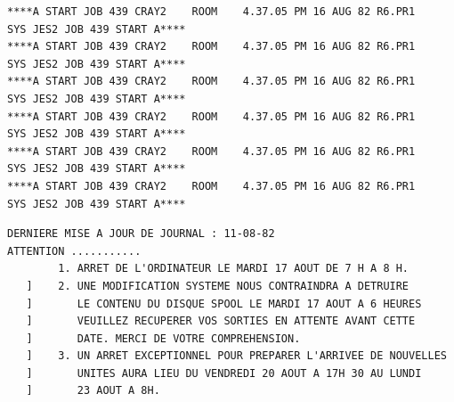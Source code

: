\begin{verbatim}
****A START JOB 439 CRAY2    ROOM    4.37.05 PM 16 AUG 82 R6.PR1    SYS JES2 JOB 439 START A****
****A START JOB 439 CRAY2    ROOM    4.37.05 PM 16 AUG 82 R6.PR1    SYS JES2 JOB 439 START A****
****A START JOB 439 CRAY2    ROOM    4.37.05 PM 16 AUG 82 R6.PR1    SYS JES2 JOB 439 START A****
****A START JOB 439 CRAY2    ROOM    4.37.05 PM 16 AUG 82 R6.PR1    SYS JES2 JOB 439 START A****
****A START JOB 439 CRAY2    ROOM    4.37.05 PM 16 AUG 82 R6.PR1    SYS JES2 JOB 439 START A****
****A START JOB 439 CRAY2    ROOM    4.37.05 PM 16 AUG 82 R6.PR1    SYS JES2 JOB 439 START A****
\end{verbatim}
\begin{verbatim}
DERNIERE MISE A JOUR DE JOURNAL : 11-08-82
ATTENTION ...........
        1. ARRET DE L'ORDINATEUR LE MARDI 17 AOUT DE 7 H A 8 H.
   ]    2. UNE MODIFICATION SYSTEME NOUS CONTRAINDRA A DETRUIRE
   ]       LE CONTENU DU DISQUE SPOOL LE MARDI 17 AOUT A 6 HEURES
   ]       VEUILLEZ RECUPERER VOS SORTIES EN ATTENTE AVANT CETTE
   ]       DATE. MERCI DE VOTRE COMPREHENSION.
   ]    3. UN ARRET EXCEPTIONNEL POUR PREPARER L'ARRIVEE DE NOUVELLES
   ]       UNITES AURA LIEU DU VENDREDI 20 AOUT A 17H 30 AU LUNDI
   ]       23 AOUT A 8H.
\end{verbatim}
